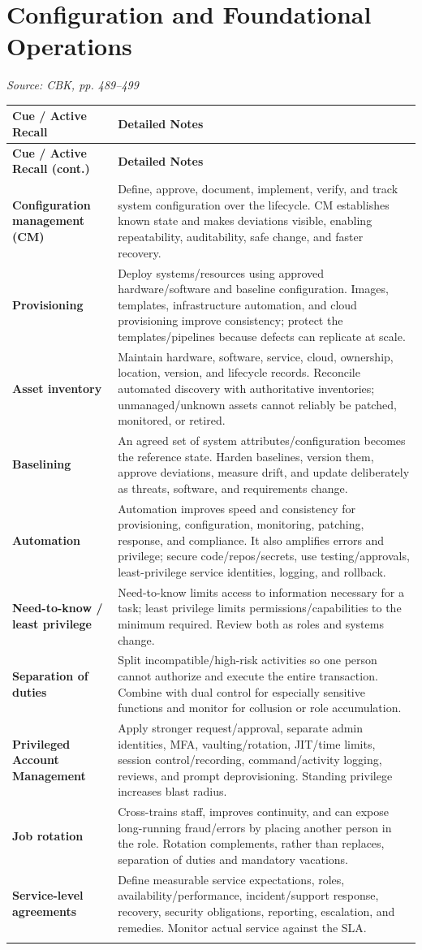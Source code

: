 \documentclass[10pt,letterpaper]{article}
\makeatletter
\newenvironment{cornell}{\rowcolors{2}{white}{notebg}\begin{longtable}{@{}>{\raggedright\arraybackslash\columncolor{cuebg}\color{navy}\bfseries}p{0.285\textwidth}>{\raggedright\arraybackslash}p{0.65\textwidth}@{}}\rowcolor{navy}\color{white}\textbf{Cue / Active Recall} & \color{white}\textbf{Detailed Notes}\\ \hline\endfirsthead\rowcolor{navy}\color{white}\textbf{Cue / Active Recall (cont.)} & \color{white}\textbf{Detailed Notes}\\ \hline\endhead}{\end{longtable}}
\newcommand{\noterow}[2]{#1 & #2\\\arrayrulecolor{line}\hline}\newcommand{\source}[1]{\par{\footnotesize\color{teal}\textit{Source: CBK, #1}}\par}
\makeatother
\begin{document}
\section{\color{navy}Configuration and Foundational Operations}
\source{pp. 489--499}
\begin{cornell}
\noterow{Configuration management (CM)}{Define, approve, document, implement, verify, and track system configuration over the lifecycle. CM establishes known state and makes deviations visible, enabling repeatability, auditability, safe change, and faster recovery.}
\noterow{Provisioning}{Deploy systems/resources using approved hardware/software and baseline configuration. Images, templates, infrastructure automation, and cloud provisioning improve consistency; protect the templates/pipelines because defects can replicate at scale.}
\noterow{Asset inventory}{Maintain hardware, software, service, cloud, ownership, location, version, and lifecycle records. Reconcile automated discovery with authoritative inventories; unmanaged/unknown assets cannot reliably be patched, monitored, or retired.}
\noterow{Baselining}{An agreed set of system attributes/configuration becomes the reference state. Harden baselines, version them, approve deviations, measure drift, and update deliberately as threats, software, and requirements change.}
\noterow{Automation}{Automation improves speed and consistency for provisioning, configuration, monitoring, patching, response, and compliance. It also amplifies errors and privilege; secure code/repos/secrets, use testing/approvals, least-privilege service identities, logging, and rollback.}
\noterow{Need-to-know / least privilege}{Need-to-know limits access to information necessary for a task; least privilege limits permissions/capabilities to the minimum required. Review both as roles and systems change.}
\noterow{Separation of duties}{Split incompatible/high-risk activities so one person cannot authorize and execute the entire transaction. Combine with dual control for especially sensitive functions and monitor for collusion or role accumulation.}
\noterow{Privileged Account Management}{Apply stronger request/approval, separate admin identities, MFA, vaulting/rotation, JIT/time limits, session control/recording, command/activity logging, reviews, and prompt deprovisioning. Standing privilege increases blast radius.}
\noterow{Job rotation}{Cross-trains staff, improves continuity, and can expose long-running fraud/errors by placing another person in the role. Rotation complements, rather than replaces, separation of duties and mandatory vacations.}
\noterow{Service-level agreements}{Define measurable service expectations, roles, availability/performance, incident/support response, recovery, security obligations, reporting, escalation, and remedies. Monitor actual service against the SLA.}
\end{cornell}
\end{document}
